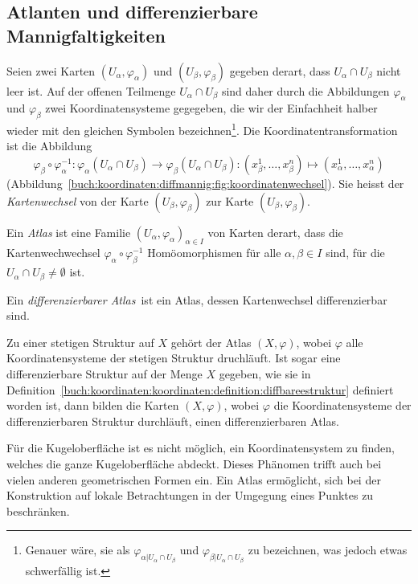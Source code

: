 \subsection{Atlanten und differenzierbare Mannigfaltigkeiten}
%
Seien zwei Karten $(U_\alpha,\varphi_\alpha)$ und $(U_\beta,\varphi_\beta)$
gegeben derart, dass $U_\alpha\cap U_\beta$ nicht leer ist.
Auf der offenen Teilmenge $U_\alpha\cap U_\beta$ sind daher durch
die Abbildungen $\varphi_\alpha$ und $\varphi_\beta$ zwei
Koordinatensysteme gegegeben, die wir der Einfachheit halber wieder
mit den gleichen Symbolen bezeichnen\footnote{Genauer wäre, sie als
$\varphi_{\alpha|U_\alpha\cap U_\beta}$ und
$\varphi_{\beta|U_\alpha\cap U_\beta}$ zu bezeichnen, was jedoch
etwas schwerfällig ist.}.
Die Koordinatentransformation ist die Abbildung
\[
\varphi_\beta\circ\varphi_\alpha^{-1}
\colon
\varphi_\alpha(U_\alpha\cap U_\beta)
\to
\varphi_\beta(U_\alpha\cap U_\beta)
:
(x_\beta^1,\dots,x_\beta^n)
\mapsto
(x_\alpha^1,\dots,x_\alpha^n)
\]
(Abbildung~\ref{buch:koordinaten:diffmannig:fig:koordinatenwechsel}).
Sie heisst der {\em Kartenwechsel} von der Karte $(U_\beta,\varphi_\beta)$
zur Karte $(U_\beta,\varphi_\beta)$.
%

\begin{definition}[Atlas]
Ein {\em Atlas} ist eine Familie $(U_\alpha,\varphi_\alpha)_{\alpha\in I}$
von Karten derart, dass die Kartenwechwechsel
$\varphi_\alpha\circ\varphi_\beta^{-1}$ Homöomorphismen
für alle $\alpha,\beta\in I$ sind, für die
$U_\alpha\cap U_\beta\ne \emptyset$ ist.
\end{definition}

\begin{definition}
Ein {\em differenzierbarer Atlas} ist ein Atlas, dessen
Kartenwechsel differenzierbar sind.
\end{definition}

Zu einer stetigen Struktur auf $X$ gehört der Atlas $(X,\varphi)$,
wobei $\varphi$ alle Koordinatensysteme der stetigen Struktur druchläuft.
Ist sogar eine differenzierbare Struktur auf der Menge $X$ gegeben,
wie sie in
Definition~\ref{buch:koordinaten:koordinaten:definition:diffbareestruktur}
definiert worden ist, dann bilden die Karten $(X,\varphi)$, wobei
$\varphi$ die Koordinatensysteme der differenzierbaren Struktur
durchläuft, einen differenzierbaren Atlas.

Für die Kugeloberfläche ist es nicht möglich, ein Koordinatensystem
zu finden, welches die ganze Kugeloberfläche abdeckt.
Dieses Phänomen trifft auch bei vielen anderen geometrischen Formen ein.
Ein Atlas ermöglicht, sich bei der Konstruktion auf lokale Betrachtungen
in der Umgegung eines Punktes zu beschränken.

